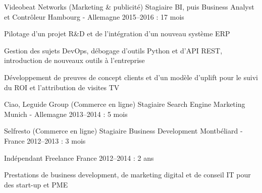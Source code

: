 \begin{cventries}
  \cventry
    {Videobeat Networks (Marketing \& publicité)} %
    {Stagiaire BI, puis Business Analyst et Contrôleur} %
    {Hambourg - Allemagne} %
    {2015--2016 : 17 mois} %
    {
      \begin{cvitems} %
        \item {Pilotage d'un projet R\&D et de l'intégration d'un nouveau système ERP}
        \item {Gestion des sujets DevOps, débogage d'outils Python et d'API REST, introduction de nouveaux outils à l'entreprise}
        \item {Développement de preuves de concept clients et d'un modèle d'uplift pour le suivi du ROI et l'attribution de visites TV}
      \end{cvitems}
    }

  \cventryshort
    {Ciao, Leguide Group (Commerce en ligne)} %
    {Stagiaire Search Engine Marketing} %
    {Munich - Allemagne} %
    {2013--2014 : 5 mois} %

  \cventryshort
    {Selfresto (Commerce en ligne)} %
    {Stagiaire Business Development} %
    {Montbéliard - France} %
    {2012--2013 : 3 mois} %

  \cventry
    {Indépendant} %
    {Freelance} %
    {France} %
    {2012--2014 : 2 ans} %
    {
      \begin{cvitems} %
        \item {Prestations de business development, de marketing digital et de conseil IT pour des start-up et PME}
      \end{cvitems}
    }

\end{cventries}
